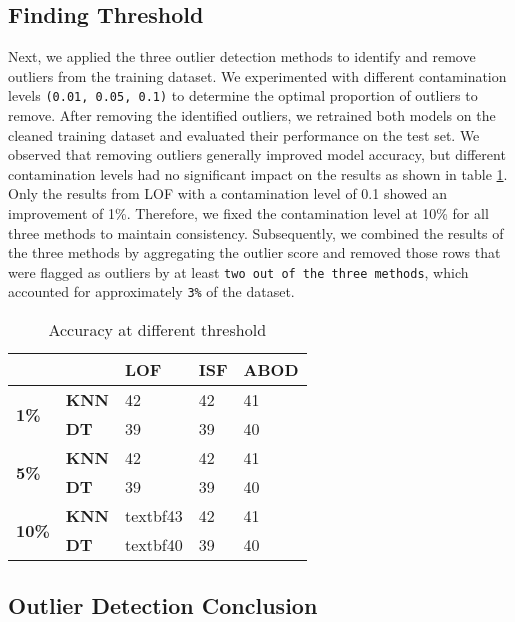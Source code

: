 \subsection{Finding Threshold}
Next, we applied the three outlier detection methods to identify and remove outliers from the training dataset.
We experimented with different contamination levels \texttt{(0.01, 0.05, 0.1)} to 
determine the optimal proportion of outliers to remove.
After removing the identified outliers, we retrained both models on the cleaned training dataset and evaluated their performance on the test set.
We observed that removing outliers generally improved model accuracy, but different contamination levels had no significant impact on the results as shown in table \ref{tab: threshold}.
Only the results from LOF with a contamination level of 0.1 showed an improvement of 1\%. 
Therefore, we fixed the contamination level at 10\% for all three methods to maintain consistency. 
Subsequently, we combined the results of the three methods by aggregating the outlier score and 
removed those rows that were flagged as outliers by at least \texttt{two out of the three methods}, 
which accounted for approximately \texttt{3\%} of the dataset.


\begin{table}[]
\centering
\begin{tabular}{|l|l|l|l|l|}
\hline
 &  & \textbf{LOF} & \textbf{ISF} & \textbf{ABOD} \\ \hline
\multirow{2}{*}{\textbf{1\%}} & \textbf{KNN} & 42 & 42 & 41 \\ \cline{2-5} 
 & \textbf{DT} & 39 & 39 & 40 \\ \hline
\multirow{2}{*}{\textbf{5\%}} & \textbf{KNN} & 42 & 42 & 41 \\ \cline{2-5} 
 & \textbf{DT} & 39 & 39 & 40 \\ \hline
\multirow{2}{*}{\textbf{10\%}} & \textbf{KNN} & textbf{43} & 42 & 41 \\ \cline{2-5} 
 & \textbf{DT} & textbf{40} & 39 & 40 \\ \hline
\end{tabular}
\caption{Accuracy at different threshold}
\label{tab: threshold}
\end{table}

\subsection{Outlier Detection Conclusion}
